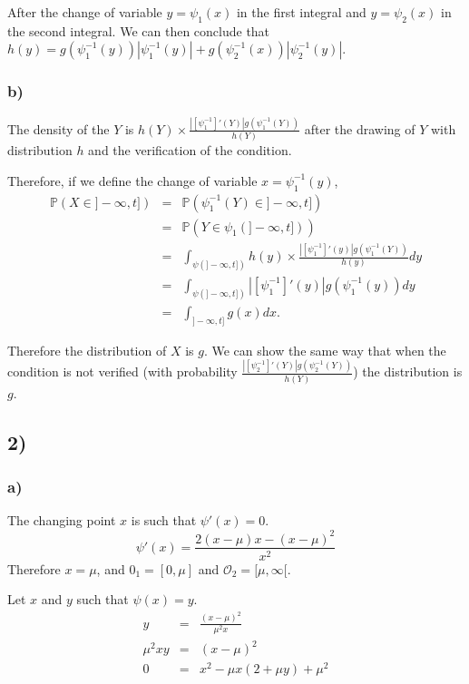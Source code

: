 After the change of variable $y = \psi_1(x)$ in the first integral and $y = \psi_2(x)$ in the second integral.
We can then conclude that $h(y) = g(\psi_1^{-1}(y)) |\psi_1^{-1}(y)| + g(\psi_2^{-1}(x)) |\psi_2^{-1}(y)|$.

\subsubsection*{b)}
The density of the $Y$ is $h(Y) \times \frac{|[\psi_1^{-1}]'(Y)| g(\psi_1^{-1}(Y))}{h(Y)}$ after the drawing of $Y$ with distribution $h$ and the verification of the condition.

Therefore, if we define the change of variable $x= \psi_1^{-1}(y)$,
\begin{eqnarray*}
	\mathbb{P}(X \in ]-\infty,t]) &=& \mathbb{P}(\psi_1^{-1}(Y) \in ]-\infty,t])\\
	&=& \mathbb{P}(Y \in \psi_1(]-\infty,t]))\\
	&=& \int_{\psi(]-\infty,t])} h(y) \times \frac{|[\psi_1^{-1}]'(y)| g(\psi_1^{-1}(Y))}{h(y)}dy\\
	&=& \int_{\psi(]-\infty,t])} |[\psi_1^{-1}]'(y)| g(\psi_1^{-1}(y))dy\\
	&=& \int_{]-\infty,t]} g(x)dx.
\end{eqnarray*}

Therefore the distribution of $X$ is $g$. We can show the same way that when the condition is not verified (with probability $\frac{|[\psi_2^{-1}]'(Y)| g(\psi_2^{-1}(Y))}{h(Y)}$) the distribution is $g$.

\subsection*{2)}
\subsubsection*{a)}

The changing point $x$ is such that $\psi'(x) = 0$.
\[\psi'(x) = \frac{2(x-\mu)x - (x-\mu)^2}{x^2}\]
Therefore $x = \mu$, and $\mathcal{0}_1 = [0,\mu]$ and $\mathcal{O}_2 = [\mu,\infty[$.

Let $x$ and $y$ such that $\psi(x) = y$.
\begin{eqnarray*}
	y &=& \frac{(x-\mu)^2}{\mu^2x}\\
	\mu^2xy &=& (x-\mu)^2\\
	0 &=& x^2-\mu x(2 + \mu y) + \mu^2
\end{eqnarray*}

